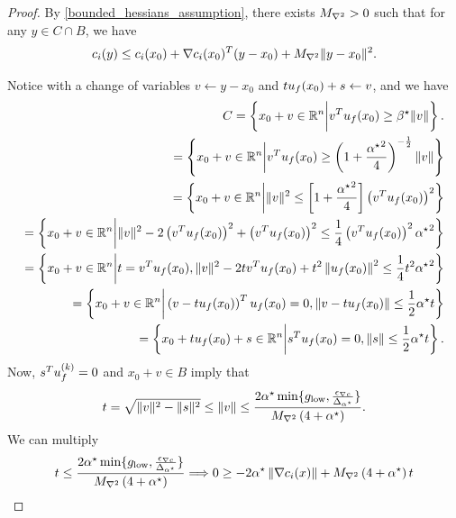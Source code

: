 \begin{proof}
By \cref{bounded_hessians_assumption}, there exists ${M_{\nabla^2}} > 0$ such that for any $y \in C \cap B$, we have
\begin{align*}
c_i(y) \le c_i(x_0) + \nabla c_i(x_0)^T (y - x_0) + {M_{\nabla^2}} \|y - x_0\|^2.
\end{align*}

Notice with a change of variables $v \gets y-x_0$ and $t{u_{f}(x_0)} + s \gets v$, and we have
\begin{align*}
C = \left\{x_0 + v \in \mathbb R^n \bigg | v^T{u_{f}(x_0)} \ge \beta^{\star} \|v\| \right\}. \\
= \left\{x_0 + v \in \mathbb R^n \bigg | v^T{u_{f}(x_0)} \ge \left(1 + \frac {{ \alpha^{\star} }^2} 4\right)^{-\frac 1 2} \|v\| \right\} \\
= \left\{x_0 + v \in \mathbb R^n \bigg | \|v\|^2 \le \left[1 + \frac {{ \alpha^{\star} }^2} 4\right]\left(v^T{u_{f}(x_0)}\right)^2 \right\} \\
= \left\{x_0 + v \in \mathbb R^n \bigg | \|v\|^2 - 2 \left(v^T{u_{f}(x_0)}\right)^2 + \left(v^T{u_{f}(x_0)}\right)^2 \le \frac 1 4\left(v^T{u_{f}(x_0)}\right)^2 { \alpha^{\star} }^2 \right\} \\
= \left\{x_0 + v \in \mathbb R^n \bigg |  t =  v^T{u_{f}(x_0)}, \|v\|^2 - 2 t v^T{u_{f}(x_0)} + t^2\left\|{u_{f}(x_0)}\right\|^2 \le \frac 1 4t^2 { \alpha^{\star} }^2 \right\} \\
= \left\{x_0 + v \in \mathbb R^n \bigg | \left(v - t{u_{f}(x_0)}\right)^T {u_{f}(x_0)} = 0, \left\|v - t{u_{f}(x_0)}\right\| \le \frac 1 2 { \alpha^{\star} } t \right\} \\
= \left\{x_0 + t {u_{f}(x_0)} + s \in \mathbb R^n \bigg | s^T {u_{f}(x_0)} = 0, \|s\| \le \frac 1 2 { \alpha^{\star} } t \right\}.
\end{align*}
Now, $s^T {u^{(k)}_f} = 0$ and $x_0 + v \in B$ imply that
\begin{align*}
t = \sqrt{\|v\|^2  - \|s\|^2} \le \|v\| \le  \frac {2{ \alpha^{\star} }  \min\{{ g_{\textrm{low}} }, \frac{{\epsilon_{\nabla c}}}{{\Delta_{\alpha^{\star}}}}\}}{{M_{\nabla^2}}\left(4 + { \alpha^{\star} }\right)}.
\end{align*}
We can multiply
\begin{align*}
t \le \frac {2\minanglealpha  \min\{\mingrad, \frac{\mingradepsilon}{\minangledelta}\}}{\maxhessian\left(4 + \minanglealpha\right)}
\Longrightarrow 0 \ge -2\minanglealpha \left\|\nabla c_i(x)\right\| +  \maxhessian\left(4 + \minanglealpha\right) t

\end{align*}
\end{proof}
